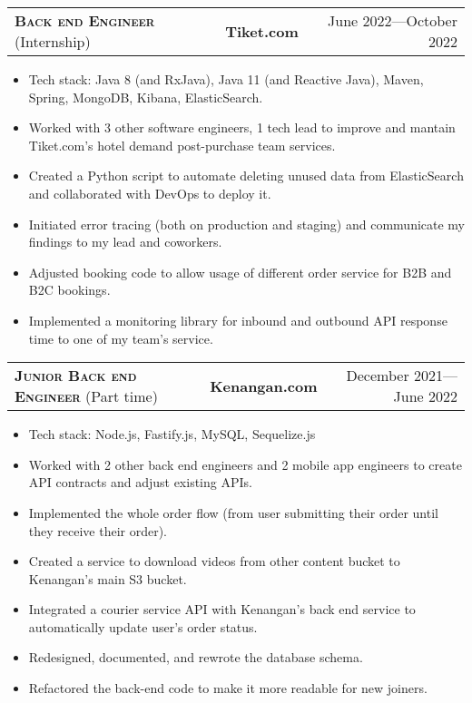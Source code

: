 \documentclass[10pt]{article}
\makeatletter
\newcommand{\workExpVspace}{1em}
\newcommand{\workExp}[6]{
    \noindent \begin{tabularx}{\textwidth}{@{}X c|r}
        \textbf{\textsc{#5}} (#2) & \textbf{#1} & #3---#4
    \end{tabularx}

    {#6}
    \vspace{\workExpVspace}
}
\makeatother
\begin{document}
\workExp
    {Tiket.com}
    {Internship}
    {June 2022}
    {October 2022}
    {Back end Engineer}
    {
        \begin{itemize}
            \item Tech stack: Java 8 (and RxJava), Java 11 (and Reactive Java), Maven, Spring,
                MongoDB, Kibana, ElasticSearch.
            \item Worked with 3 other software engineers, 1 tech lead to improve and mantain
                Tiket.com's hotel demand post-purchase team services.
            \item Created a Python script to automate deleting unused data from ElasticSearch and
                collaborated with DevOps to deploy it.
            \item Initiated error tracing (both on production and staging) and communicate my
                findings to my lead and coworkers.
            \item Adjusted booking code to allow usage of different order service for B2B and B2C
                bookings.
            \item Implemented a monitoring library for inbound and outbound API response time to
                one of my team’s service.
        \end{itemize}
    }

\workExp
    {Kenangan.com}
    {Part time}
    {December 2021}
    {June 2022}
    {Junior Back end Engineer}
    {
        \begin{itemize}
            \item Tech stack: Node.js, Fastify.js, MySQL, Sequelize.js
            \item Worked with 2 other back end engineers and 2 mobile app engineers to create API
                contracts and adjust existing APIs.
            \item Implemented the whole order flow (from user submitting their order until they
                receive their order).
            \item Created a service to download videos from other content bucket to Kenangan's
                main S3 bucket.
            \item Integrated a courier service API with Kenangan’s back end service to
                automatically update user’s order status.
            \item Redesigned, documented, and rewrote the database schema.
            \item Refactored the back-end code to make it more readable for new joiners.
        \end{itemize}
    }
\end{document}

